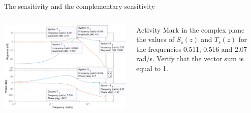 \documentclass[presentation,aspectratio=169]{beamer}
\begin{document}
\begin{frame}[label={sec:org8bea005}]{The sensitivity and the complementary sensitivity}
\begin{columns}
\begin{column}{0.7\columnwidth}
\begin{center}
\includegraphics[width=1.05\linewidth]{../matlab/bode-sensitivity-exercise-crop}
\end{center}
\end{column}

\begin{column}{0.3\columnwidth}
\pause

\alert{Activity} Mark in the complex plane the values of \(S_s(z)\) and \(T_s(z)\) for the frequencies 0.511, 0.516 and 2.07 rad/s.  Verify that the vector sum is equal to 1.
\end{column}
\end{columns}
\end{frame}
\end{document}
